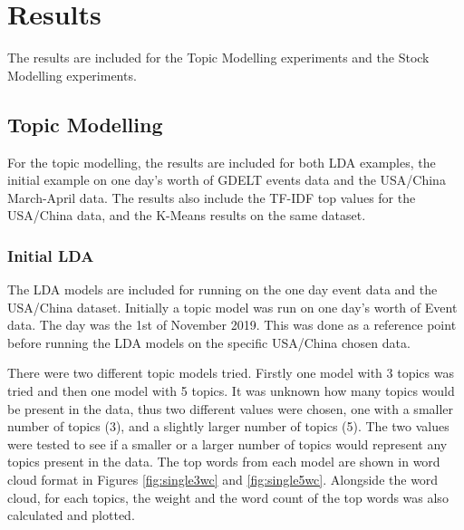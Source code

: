 \section{Results}
\label{results}
The results are included for the Topic Modelling experiments and the Stock Modelling experiments. 

\subsection{Topic Modelling}
For the topic modelling, the results are included for both LDA examples, the initial example on one day's worth of GDELT events data and the USA/China March-April data. The results also include the TF-IDF top values for the USA/China data, and the K-Means results on the same dataset.

\subsubsection{Initial LDA}
The LDA models are included for running on the one day event data and the USA/China dataset. 
Initially a topic model was run on one day's worth of Event data. The day was the 1st of November 2019. This was done as a reference point before running the LDA models on the specific USA/China chosen data.

There were two different topic models tried. Firstly one model with 3 topics was tried and then one model with 5 topics. It was unknown how many topics would be present in the data, thus two different values were chosen, one with a smaller number of topics (3), and a slightly larger number of topics (5). The two values were tested to see if a smaller or a larger number of topics would represent any topics present in the data. The top words from each model are shown in word cloud format in Figures \ref{fig:single3wc} and \ref{fig:single5wc}. Alongside the word cloud, for each topics, the weight and the word count of the top words was also calculated and plotted. 
	
